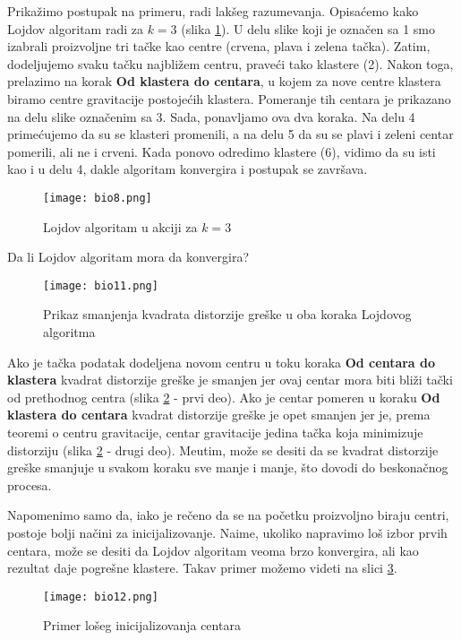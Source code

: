 Prikažimo postupak na primeru, radi lakšeg razumevanja. Opisaćemo kako Lojdov algoritam radi za $k=3$ (slika \ref{slika 10}). 
U delu slike koji je označen sa 1 smo izabrali proizvoljne tri tačke kao centre (crvena, plava i zelena tačka). Zatim, dodeljujemo svaku tačku najbližem centru, praveći tako klastere (2). Nakon toga, prelazimo na korak \textbf{Od klastera do centara}, u kojem za nove centre klastera biramo centre gravitacije postojećih klastera. Pomeranje tih centara je prikazano na delu slike označenim sa 3. Sada, ponavljamo ova dva koraka. Na delu 4 primećujemo da su se klasteri promenili, a na delu 5 da su se plavi i zeleni centar pomerili, ali ne i crveni. Kada ponovo odredimo klastere (6), vidimo da su isti kao i u delu 4, dakle algoritam konvergira i postupak se završava.
\begin{figure}[h!]
    \centering
    \texttt{[image: bio8.png]}
    \caption{Lojdov algoritam u akciji za $k=3$}
    \label{slika 10}
\end{figure}

Da li Lojdov algoritam mora da konvergira?
\begin{figure}[h!]
    \centering
    \texttt{[image: bio11.png]}
    \caption{Prikaz smanjenja kvadrata distorzije greške u oba koraka Lojdovog algoritma}
    \label{slika 11}
\end{figure}


Ako je tačka podatak dodeljena novom centru u toku koraka \textbf{Od centara do klastera} kvadrat distorzije greške je smanjen jer ovaj centar mora biti bliži tački od prethodnog centra (slika \ref{slika 11} - prvi deo). Ako je centar pomeren u koraku \textbf{Od klastera do centara} kvadrat distorzije greške je opet smanjen jer je, prema teoremi o centru gravitacije, centar gravitacije jedina tačka koja minimizuje distorziju (slika \ref{slika 11} - drugi deo). Me\dj utim, može se desiti da se kvadrat distorzije greške smanjuje u svakom koraku sve manje i manje, što dovodi do beskonačnog procesa.


Napomenimo samo da, iako je rečeno da se na početku proizvoljno biraju centri, postoje bolji načini za inicijalizovanje. Naime, ukoliko napravimo loš izbor prvih centara, može se desiti da Lojdov algoritam veoma brzo konvergira, ali kao rezultat daje pogrešne klastere. Takav primer možemo videti na slici \ref{slika 12}.
\begin{figure}[h!]
    \centering
    \texttt{[image: bio12.png]}
    \caption{Primer lošeg inicijalizovanja centara}
    \label{slika 12}
\end{figure}


